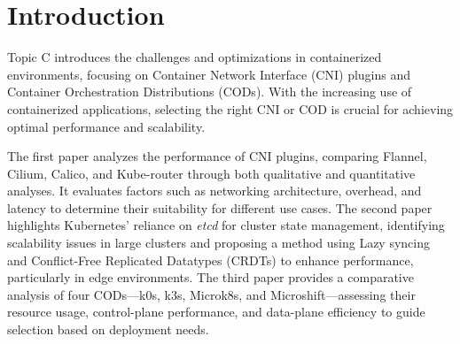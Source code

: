 \section{Introduction}%
\label{sec:Introduction}
Topic C introduces the challenges and optimizations in containerized environments, focusing on Container Network Interface (CNI) plugins and Container Orchestration Distributions (CODs).
With the increasing use of containerized applications, selecting the right CNI or COD is crucial for achieving optimal performance and scalability.

The first paper \cite{C1} analyzes the performance of CNI plugins, comparing Flannel, Cilium, Calico, and Kube-router through both qualitative and quantitative analyses. 
It evaluates factors such as networking architecture, overhead, and latency to determine their suitability for different use cases.
The second paper \cite{C2} highlights Kubernetes' reliance on \textit{etcd} for cluster state management, identifying scalability issues in large clusters and proposing a method using Lazy syncing and Conflict-Free Replicated Datatypes (CRDTs) to enhance performance, particularly in edge environments.
The third paper \cite{C3} provides a comparative analysis of four CODs—k0s, k3s, Microk8s, and Microshift—assessing their resource usage, control-plane performance, and data-plane efficiency to guide selection based on deployment needs.
